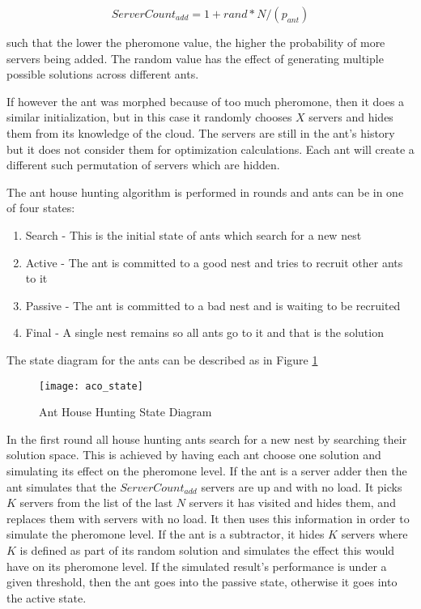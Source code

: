 \begin{equation}
ServerCount_{add} = 1 + rand * N / (p_{ant})
\end{equation}

such that the lower the pheromone value, the higher the probability of more servers being added. The random value has the effect of generating multiple possible solutions across different ants.

If however the ant was morphed because of too much pheromone, then it does a similar initialization, but in this case it randomly chooses $X$ servers and hides them from its knowledge of the cloud. The servers are still in the ant's history but it does not consider them for optimization calculations. Each ant will create a different such permutation of servers which are hidden.

The ant house hunting algorithm is performed in rounds and ants can be in one of four states:

\begin{enumerate}
	\item Search - This is the initial state of ants which search for a new nest
	\item Active - The ant is committed to a good nest and tries to recruit other ants to it
	\item Passive - The ant is committed to a bad nest and is waiting to be recruited
	\item Final - A single nest remains so all ants go to it and that is the solution
\end{enumerate}

The state diagram for the ants can be described as in Figure \ref{fig:anthousehuntingstate}

\begin{figure}
	\centering
	\texttt{[image: aco\_state]}
	\caption{Ant House Hunting State Diagram}
	\label{fig:anthousehuntingstate}
\end{figure}

In the first round all house hunting ants search for a new nest by searching their solution space. This is achieved by having each ant choose one solution and simulating its effect on the pheromone level. If the ant is a server adder then the ant simulates that the $ServerCount_{add}$ servers are up and with no load. It picks $K$ servers from the list of the last $N$ servers it has visited and hides them, and replaces them with servers with no load. It then uses this information in order to simulate the pheromone level. If the ant is a subtractor, it hides $K$ servers where $K$ is defined as part of its random solution and simulates the effect this would have on its pheromone level. If the simulated result's performance is under a given threshold, then the ant goes into the passive state, otherwise it goes into the active state.

